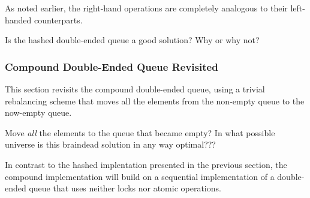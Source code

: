 As noted earlier, the right-hand operations are completely analogous
to their left-handed counterparts.

\QuickQuiz{}
	Is the hashed double-ended queue a good solution?
	Why or why not?
 \QuickQuizEnd

\subsubsection{Compound Double-Ended Queue Revisited}
\label{sec:SMPdesign:Compound Double-Ended Queue Revisited}

This section revisits the compound double-ended queue, using a trivial
rebalancing scheme that moves all the elements from the non-empty
queue to the now-empty queue.

\QuickQuiz{}
	Move \emph{all} the elements to the queue that became empty?
	In what possible universe is this braindead solution in any
	way optimal???
 \QuickQuizEnd

In contrast to the hashed implentation presented in
the previous section, the compound implementation will build on
a sequential implementation of a double-ended queue that uses
neither locks nor atomic operations.

